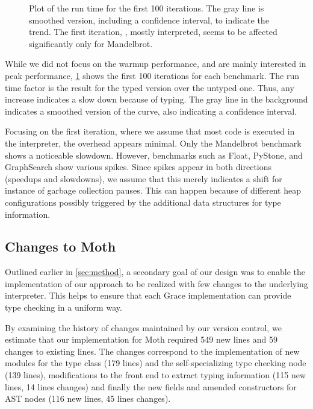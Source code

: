 \begin{figure}
	\TypingWarmup{}
	\caption{Plot of the run time for the first 100 iterations.
           The gray line is smoothed version, including a confidence interval,
           to indicate the trend.
           The first iteration, \ie, mostly interpreted, seems
           to be affected significantly only for Mandelbrot.}
	\label{fig:typing-warmup}
\end{figure}

While we did not focus on the warmup performance,
and are mainly interested in peak performance,
\cref{fig:typing-warmup} shows the first 100 iterations for each benchmark.
The run time factor is the result for the typed version over the untyped one.
Thus, any increase indicates a slow down because of typing.
The gray line in the background indicates a smoothed version of the curve,
also indicating a confidence interval.

Focusing on the first iteration,
where we assume that most code is executed in the interpreter,
the overhead appears minimal.
Only the Mandelbrot benchmark shows a noticeable slowdown.
However, benchmarks such as Float, PyStone, and GraphSearch show various spikes.
Since spikes appear in both directions (speedups and slowdowns),
we assume that this merely indicates a shift
for instance of garbage collection pauses.
This can happen because of different heap configurations
possibly triggered by the additional data structures for type information.



%
%

\subsection{Changes to Moth}

Outlined earlier in \cref{sec:method}, a secondary
goal of our design was to enable the implementation of our approach to be
realized with few changes to the underlying interpreter.
This helps to ensure that each Grace implementation
can provide type checking in a uniform way.

By examining the history of changes maintained by our version control, 
we estimate that our implementation for Moth required
549 new lines and 59 changes to existing lines. 
The changes correspond to the implementation of 
new modules for the type class (179 lines) and 
the self-specializing type checking node (139 lines),
modifications to the front end to extract typing information
(115 new lines, 14 lines changes)
and finally the new fields and amended constructors for AST nodes 
(116 new lines, 45 lines changes).

